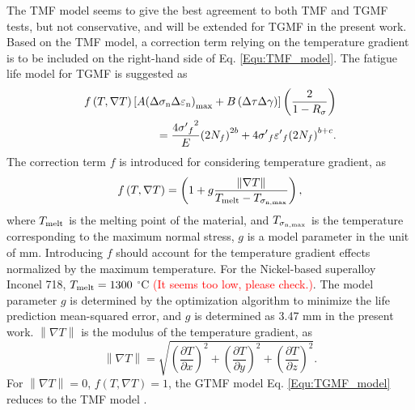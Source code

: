 \documentclass[preprint,5p,twocolumn,10pt,sort&compress]{elsarticle}
\newcommand{\marked}[1]{\textcolor{red}{#1}}
\begin{document}
The TMF model  \cite{SUN2019228}  seems to give the best agreement to both TMF and TGMF tests, but not conservative, and will be extended for TGMF in the present work.
Based on the TMF model, a correction term relying on the temperature gradient is to be included on the right-hand side of Eq. \eqref{Equ:TMF_model}. The fatigue life model for TGMF is suggested as
\begin{equation}
\begin{aligned}
f\left( {T,\nabla T} \right)\left[ {A{{\left( {\Delta {\sigma _{\rm n}}\Delta {\varepsilon _{\rm n}}} \right)}_{\max }} + B\left( {\Delta \tau \Delta \gamma } \right)} \right]\left( {\frac{2}{{1 - {R_\sigma }}}} \right) \\ 
= \frac{{4{{\sigma '}_f}^2}}{E}{\left( {2{N_f}} \right)^{2b}} + 4{{\sigma '}_f}{{\varepsilon '}_f}{\left( {2{N_f}} \right)^{b + c}}.
\end{aligned}
\label{Equ:TGMF_model}
\end{equation}
The correction term $f$ is introduced  for considering temperature gradient, as
\begin{equation}
f\left( {T,\nabla T} \right) = \left( {1 + g\frac{{\left\| {\nabla T} \right\|}}{{{T_{{\rm{melt}}}} - {T_{{\sigma _{\rm n,\max }}}}}}} \right),
\label{Equ:TGMF_term}
\end{equation}
where ${T_{{\rm{melt}}}}$ is the melting point of the material, and ${T_{{\sigma _{\rm n,\max }}}}$ is the temperature corresponding to the maximum normal stress, $g$ is a model parameter in the unit of mm. Introducing $f$ should account for the temperature gradient effects normalized by the maximum temperature. For the Nickel-based superalloy Inconel 718, ${T_{{\rm{melt}}}}=1300$ $^\circ$C \marked{(It seems too low, please check.)}. The model parameter $g$ is determined by the optimization algorithm to minimize the life prediction
mean-squared error, and $g$ is determined as 3.47 mm in the present work. ${\left\| {\nabla T} \right\|}$ is the modulus of the temperature gradient, as
\begin{equation}
\left\| {\nabla T} \right\| = \sqrt {{{\left( {\frac{{\partial T}}{{\partial x}}} \right)}^2} + {{\left( {\frac{{\partial T}}{{\partial y}}} \right)}^2} + {{\left( {\frac{{\partial T}}{{\partial z}}} \right)}^2}}.
\end{equation}
For $\left\| {\nabla T} \right\|=0$, $f\left( {T,\nabla T} \right)=1$, the GTMF model Eq. \eqref{Equ:TGMF_model} reduces to the TMF model \cite{SUN2019228}.
\end{document}

